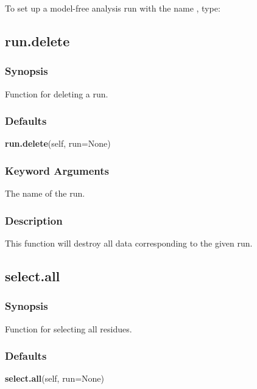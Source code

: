 To set up a model-free analysis run with the name 
, type:




\newpage

\subsection{run.delete}


\subsubsection{Synopsis}

Function for deleting a run.

\subsubsection{Defaults}

\textsf{\textbf{run.delete}(self, run=None)}


\subsubsection{Keyword Arguments}


  The name of the run.

\subsubsection{Description}

This function will destroy all data corresponding to the given run.


\newpage

\subsection{select.all}


\subsubsection{Synopsis}

Function for selecting all residues.

\subsubsection{Defaults}

\textsf{\textbf{select.all}(self, run=None)}


